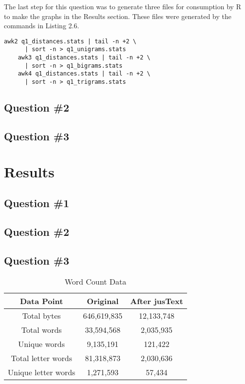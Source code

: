 \documentclass[a4paper,12pt]{article}
\begin{document}
The last step for this question was to generate three files for consumption by R to make the graphs in the
Results section. These files were generated by the commands in Listing 2.6.

\begin{lstlisting}[basicstyle=\ttfamily,caption={Generating R Input Files}]
    awk2 q1_distances.stats | tail -n +2 \
      | sort -n > q1_unigrams.stats
    awk3 q1_distances.stats | tail -n +2 \
      | sort -n > q1_bigrams.stats
    awk4 q1_distances.stats | tail -n +2 \
      | sort -n > q1_trigrams.stats
\end{lstlisting}

\subsection{Question \#2}


\subsection{Question \#3}



\section{Results}

\subsection{Question \#1}

\subsection{Question \#2}

\subsection{Question \#3}

\begin{table}[H]
\centering
\caption{Word Count Data}
\begin{tabular}{ | c | c | c | }
\hline
\textbf{Data Point}  & \textbf{Original} & \textbf{After jusText} \\ \hline
Total bytes          & 646,619,835  & 12,133,748    \\ \hline
Total words          & 33,594,568   & 2,035,935     \\ \hline
Unique words         & 9,135,191    & 121,422       \\ \hline
Total letter words   & 81,318,873   & 2,030,636     \\ \hline
Unique letter words  & 1,271,593    & 57,434        \\ \hline
\end{tabular}
\end{table}




\end{document}
